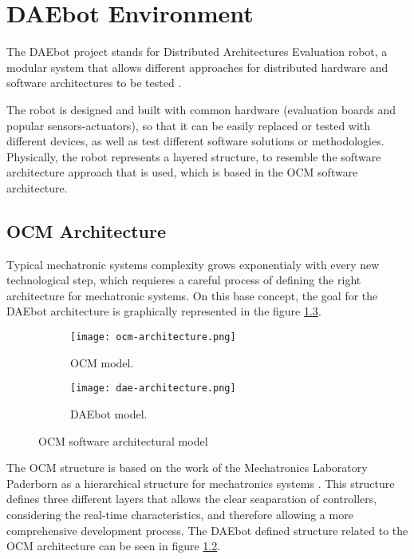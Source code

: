 
\chapter{DAEbot Environment}

The DAEbot project stands for Distributed Architectures Evaluation robot, a modular system that allows different approaches for distributed hardware and software architectures to be tested \cite{Wiki}.

The robot is designed and built with common hardware (evaluation boards and popular sensors-actuators), so that it can be easily replaced or tested with different devices, as well as test different software solutions or methodologies. Physically, the robot represents a layered structure, to resemble the software architecture approach that is used, which is based in the OCM software architecture.

\section{OCM Architecture}

Typical mechatronic systems complexity grows exponentialy with every new technological step, which requieres a careful process of defining the right architecture for mechatronic systems. On this base concept, the goal for the DAEbot architecture is graphically represented in the figure \ref{fig:ocm-dae}.

\begin{figure}[htp]
	\centering
	\begin{subfigure}{0.5\textwidth}
		\centering
		\texttt{[image: ocm-architecture.png]}
		\caption{OCM model.} \label{fig:ocm-architecture}
	\end{subfigure}%
	\begin{subfigure}{0.5\textwidth}
		\centering
		\texttt{[image: dae-architecture.png]}
		\caption{DAEbot model.} \label{fig:dae-architecture}
	\end{subfigure}%
	\caption{OCM software architectural model} \label{fig:ocm-dae}
\end{figure}%

The OCM structure is based on the work of the Mechatronics Laboratory Paderborn as a hierarchical structure for mechatronics systems \cite{Lueckel2001}. This structure defines three different layers that allows the clear seaparation of controllers, considering the real-time characteristics, and therefore allowing a more comprehensive development process. The DAEbot defined structure related to the OCM architecture can be seen in figure \ref{fig:dae-architecture}.

